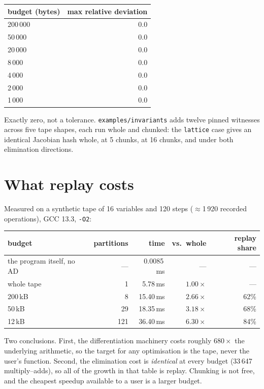 \documentclass[11pt,a4paper]{report}
\newcommand{\code}[1]{\texttt{#1}}
\begin{document}
\begin{center}
\begin{tabular}{@{}lr@{}}
\toprule
budget (bytes) & max relative deviation \\
\midrule
200\,000 & 0.0 \\
50\,000  & 0.0 \\
20\,000  & 0.0 \\
8\,000   & 0.0 \\
4\,000   & 0.0 \\
2\,000   & 0.0 \\
1\,000   & 0.0 \\
\bottomrule
\end{tabular}
\end{center}

\noindent
Exactly zero, not a tolerance. \code{examples/invariants} adds twelve pinned
witnesses across five tape shapes, each run whole and chunked: the
\code{lattice} case gives an identical Jacobian hash whole, at 5 chunks, at 16
chunks, and under both elimination directions.

\section{What replay costs}
\label{sec:replaycost}

Measured on a synthetic tape of 16 variables and 120 steps
($\approx$1\,920 recorded operations), GCC 13.3, \code{-O2}:

\begin{center}
\begin{tabular}{@{}lrrrr@{}}
\toprule
budget & partitions & time & vs.\ whole & replay share \\
\midrule
the program itself, no AD & --- & 0.0085\,ms & --- & --- \\
whole tape   & 1   & 5.78\,ms  & $1.00\times$ & --- \\
200\,kB      & 8   & 15.40\,ms & $2.66\times$ & 62\% \\
50\,kB       & 29  & 18.35\,ms & $3.18\times$ & 68\% \\
12\,kB       & 121 & 36.40\,ms & $6.30\times$ & 84\% \\
\bottomrule
\end{tabular}
\end{center}

Two conclusions. First, the differentiation machinery costs roughly $680\times$
the underlying arithmetic, so the target for any optimisation is the tape, never
the user's function. Second, the elimination cost is \emph{identical} at every
budget (33\,647 multiply--adds), so all of the growth in that table is replay.
Chunking is not free, and the cheapest speedup available to a user is a larger
budget.
\end{document}
